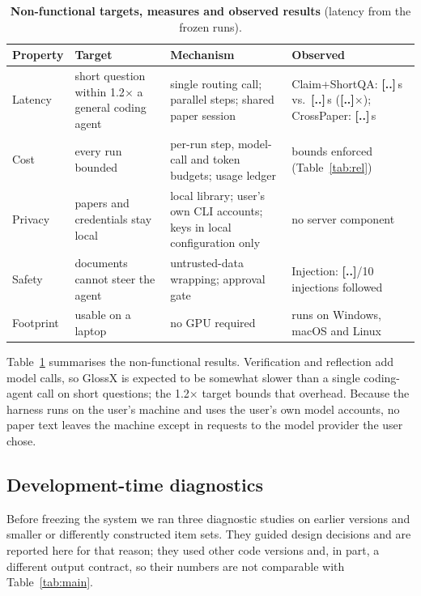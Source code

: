 \documentclass{article}
\newcommand{\sysname}{GlossX}
\newcommand{\ds}[1]{\textsf{#1}}
\newcommand{\TBD}[1]{\textcolor{glred}{\textbf{[#1]}}}
\begin{document}
\begin{table}[h]
  \caption{\textbf{Non-functional targets, measures and observed results} (latency from the frozen runs).}
  \label{tab:nfr}
  \centering\scriptsize
  \begin{tabularx}{\textwidth}{@{}>{\raggedright\arraybackslash}p{1.5cm}>{\raggedright\arraybackslash}p{3.2cm}>{\raggedright\arraybackslash}X>{\raggedright\arraybackslash}p{3.6cm}@{}}
    \toprule
    \textbf{Property} & \textbf{Target} & \textbf{Mechanism} & \textbf{Observed} \\
    \midrule
    Latency & short question within 1.2$\times$ a general coding agent & single routing call; parallel steps; shared paper session & \ds{Claim}+\ds{ShortQA}: \TBD{..}\,s vs.\ \TBD{..}\,s (\TBD{..}$\times$); \ds{CrossPaper}: \TBD{..}\,s \\
    Cost & every run bounded & per-run step, model-call and token budgets; usage ledger & bounds enforced (Table~\ref{tab:rel}) \\
    Privacy & papers and credentials stay local & local library; user's own CLI accounts; keys in local configuration only & no server component \\
    Safety & documents cannot steer the agent & untrusted-data wrapping; approval gate & \ds{Injection}: \TBD{..}/10 injections followed \\
    Footprint & usable on a laptop & no GPU required & runs on Windows, macOS and Linux \\
    \bottomrule
  \end{tabularx}
\end{table}

Table~\ref{tab:nfr} summarises the non-functional results. Verification and reflection add model calls, so \sysname{} is expected to be somewhat slower than a single coding-agent call on short questions; the 1.2$\times$ target bounds that overhead. Because the harness runs on the user's machine and uses the user's own model accounts, no paper text leaves the machine except in requests to the model provider the user chose.

\subsection{Development-time diagnostics}
\label{sec:res-diag}
Before freezing the system we ran three diagnostic studies on earlier versions and smaller or differently constructed item sets. They guided design decisions and are reported here for that reason; they used other code versions and, in part, a different output contract, so their numbers are not comparable with Table~\ref{tab:main}.
\end{document}
